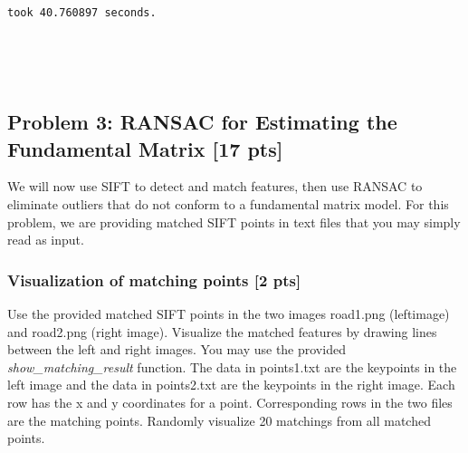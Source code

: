 \documentclass[11pt]{article}
\begin{document}
    \begin{Verbatim}[commandchars=\\\{\}]
took 40.760897 seconds.

    \end{Verbatim}

    \begin{center}
    \end{center}
    { \hspace*{\fill} \\}
    
    \begin{center}
    \end{center}
    { \hspace*{\fill} \\}
    
    \subsection{Problem 3: RANSAC for Estimating the Fundamental Matrix
{[}17
pts{]}}\label{problem-3-ransac-for-estimating-the-fundamental-matrix-17-pts}

We will now use SIFT to detect and match features, then use RANSAC to
eliminate outliers that do not conform to a fundamental matrix model.
For this problem, we are providing matched SIFT points in text files
that you may simply read as input.

    \subsubsection{Visualization of matching points {[}2
pts{]}}\label{visualization-of-matching-points-2-pts}

Use the provided matched SIFT points in the two images road1.png
(leftimage) and road2.png (right image). Visualize the matched features
by drawing lines between the left and right images. You may use the
provided \emph{show\_matching\_result} function. The data in points1.txt
are the keypoints in the left image and the data in points2.txt are the
keypoints in the right image. Each row has the x and y coordinates for a
point. Corresponding rows in the two files are the matching points.
Randomly visualize 20 matchings from all matched points.
\end{document}
